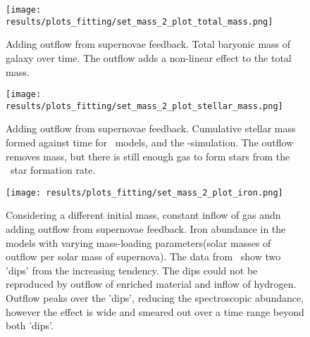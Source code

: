 \begin{figure}[h]
  \begin{minipage}[t][][t]{0.49\textwidth}
  \centering
  \texttt{[image: results/plots\_fitting/set\_mass\_2\_plot\_total\_mass.png]}
  \caption[Total mass of \fiduccialomega with outflow mass-fitting]{
    \label{fig:fit-v1-2-total}
    Adding outflow from supernovae feedback.
    Total baryonic mass of galaxy over time.
    The outflow adds a non-linear effect to the total mass.
  }
  \end{minipage}
  \begin{minipage}[t][][t]{0.49\textwidth}
  \centering
  \texttt{[image: results/plots\_fitting/set\_mass\_2\_plot\_stellar\_mass.png]}
  \caption[Stellar mass of \fiduccialomega for with outflow mass-fitting]{
    \label{fig:fit-v1-2-stellar}
    Adding outflow from supernovae feedback.
    Cumulative stellar mass formed against time for  \omegamodel\ models, and the \eris-simulation.
    The outflow removes mass, but there is still enough gas to form stars from the \eris\ star formation rate.
  }
  \end{minipage}
\end{figure}
\begin{figure}[h]
  \centering
  \texttt{[image: results/plots\_fitting/set\_mass\_2\_plot\_iron.png]}
  \caption[\[Fe/H\] of \fiduccialomega for with outflow mass-fitting]{
    \label{fig:fit-v1-2-iron}
    Considering a different initial mass, constant inflow of gas andn adding outflow from supernovae feedback.
    Iron abundance in the models with varying mass-loading parameters(solar masses of outflow per solar mass of supernova). The data from \eris\ show two 'dips' from the increasing tendency.
    The dips could not be reproduced by outflow of enriched material and inflow of hydrogen. Outflow peaks over the 'dips', reducing the spectroscopic abundance, however the effect is wide and smeared out over a time range beyond both 'dips'.
  }
\end{figure}
